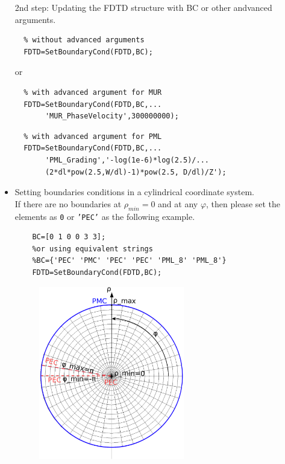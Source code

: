 \begin{itemize}
      2nd step: Updating the FDTD structure with BC or other andvanced arguments.
      \begin{myindentpar}	    
		    \begin{lstlisting}
  % without advanced arguments
  FDTD=SetBoundaryCond(FDTD,BC); 
		    \end{lstlisting}
		      or
		    \begin{lstlisting}
  % with advanced argument for MUR
  FDTD=SetBoundaryCond(FDTD,BC,...
       'MUR_PhaseVelocity',300000000);
			\end{lstlisting}
		    \begin{lstlisting}
  % with advanced argument for PML
  FDTD=SetBoundaryCond(FDTD,BC,...
       'PML_Grading','-log(1e-6)*log(2.5)/...
       (2*dl*pow(2.5,W/dl)-1)*pow(2.5, D/dl)/Z');
		    \end{lstlisting}	 
    \end{myindentpar}	
 \item Setting boundaries conditions in a cylindrical coordinate system.\\
If there are no boundaries at  $\rho_{min}=0$ and at any $\varphi$, then please set the elements as \texttt{0} or \texttt{'PEC'} as the following example.
    \begin{lstlisting}[caption={BC assignment in a cylindrical coordinate system as fig \ref{fig:Ex. SetBoundaryCond in cylin.}},label={listing:SettingofBC in a cylin.}]
	% no boundaries at rhomin=0 , phi_min and phi_max
	BC=[0 1 0 0 3 3];
	%or using equivalent strings
	%BC={'PEC' 'PMC' 'PEC' 'PEC' 'PML_8' 'PML_8'} 
	FDTD=SetBoundaryCond(FDTD,BC); 
			\end{lstlisting} 
    \begin{figure}[ht]
			  \centering
			\includegraphics[width=0.6\textwidth]{svg/CylinBCXY.eps}\qquad

\end{figure}
\end{itemize}
